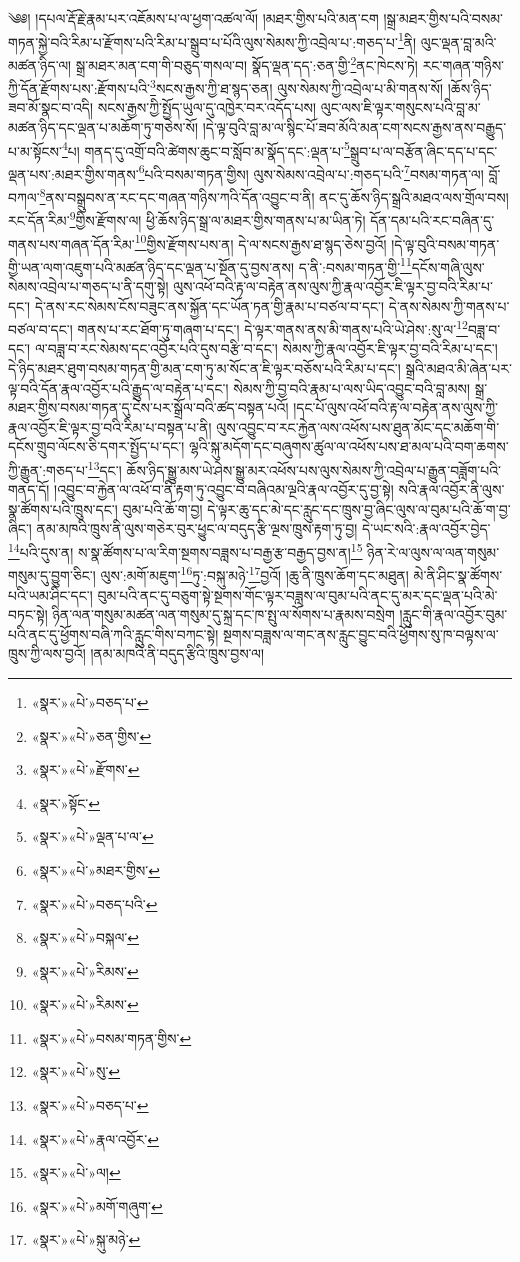 ༄༅། །དཔལ་རྡོ་རྗེ་རྣམ་པར་འཇོམས་པ་ལ་ཕྱག་འཚལ་ལོ། །མཐར་གྱིས་པའི་མན་ངག །སྒྲ་མཐར་གྱིས་པའི་བསམ་གཏན་སྐྱེ་བའི་རིམ་པ་རྫོགས་པའི་རིམ་པ་སྒྲུབ་པ་པོའི་ལུས་སེམས་ཀྱི་འབྲེལ་པ་:གཅད་པ་\footnote{«སྣར་»«པེ་»བཅད་པ་}ནི། ལུང་ལྡན་བླ་མའི་མཚན་ཉིད་ལ། སྒྲ་མཐར་མན་ངག་གི་བཅུད་གསལ་བ། སྣོད་ལྡན་དད་:ཅན་གྱི་\footnote{«སྣར་»«པེ་»ཅན་གྱིས་}ནང་ཁེངས་ཏེ། རང་གཞན་གཉིས་ཀྱི་དོན་རྫོགས་པས་:རྫོགས་པའི་\footnote{«སྣར་»«པེ་»རྫོགས་}སངས་རྒྱས་ཀྱི་ཐ་སྙད་ཅན། ལུས་སེམས་ཀྱི་འབྲེལ་པ་མི་གནས་སོ། །ཆོས་ཉིད་ཟབ་མོ་སྣང་བ་འདི། སངས་རྒྱས་ཀྱི་སྤྱོད་ཡུལ་དུ་འཁྱེར་བར་འདོད་པས། ལུང་ལས་ཇི་ལྟར་གསུངས་པའི་བླ་མ་མཚན་ཉིད་དང་ལྡན་པ་མཆོག་ཏུ་གཅེས་སོ། །དེ་ལྟ་བུའི་བླ་མ་ལ་སྙིང་པོ་ཟབ་མོའི་མན་ངག་སངས་རྒྱས་ནས་བརྒྱུད་པ་མ་སྟོངས་\footnote{«སྣར་»སྟོང་}པ། གནད་དུ་འགྲོ་བའི་ཚེགས་ཆུང་བ་སློབ་མ་སྣོད་དང་:ལྡན་པ་\footnote{«སྣར་»«པེ་»ལྡན་པ་ལ་}སྒྲུབ་པ་ལ་བརྩོན་ཞིང་དད་པ་དང་ལྡན་པས་:མཐར་གྱིས་གནས་\footnote{«སྣར་»«པེ་»མཐར་གྱིས་}པའི་བསམ་གཏན་གྱིས། ལུས་སེམས་འབྲེལ་པ་:གཅད་པའི་\footnote{«སྣར་»«པེ་»བཅད་པའི་}བསམ་གཏན་ལ། བློ་བཀལ་\footnote{«སྣར་»«པེ་»བསྐལ་}ནས་བསྒྲུབས་ན་རང་དང་གཞན་གཉིས་ཀའི་དོན་འབྱུང་བ་ནི། ནང་དུ་ཆོས་ཉིད་སྒྲའི་མཐའ་ལས་གྲོལ་བས། རང་དོན་རིམ་\footnote{«སྣར་»«པེ་»རིམས་}གྱིས་རྫོགས་ལ། ཕྱི་ཆོས་ཉིད་སྒྲ་ལ་མཐར་གྱིས་གནས་པ་མ་ཡིན་ཏེ། དོན་དམ་པའི་རང་བཞིན་དུ་གནས་པས་གཞན་དོན་རིམ་\footnote{«སྣར་»«པེ་»རིམས་}གྱིས་རྫོགས་པས་ན། དེ་ལ་སངས་རྒྱས་ཐ་སྙད་ཅེས་བྱའོ། །དེ་ལྟ་བུའི་བསམ་གཏན་གྱི་ཡན་ལག་འཇུག་པའི་མཚན་ཉིད་དང་ལྡན་པ་སྔོན་དུ་བྱས་ནས། ད་ནི་:བསམ་གཏན་གྱི་\footnote{«སྣར་»«པེ་»བསམ་གཏན་གྱིས་}དངོས་གཞི་ལུས་སེམས་འབྲེལ་པ་གཅད་པ་ནི་དགུ་སྟེ། ལུས་འཕོ་བའི་རྟ་ལ་བརྟེན་ནས་ལུས་ཀྱི་རྣལ་འབྱོར་ཇི་ལྟར་བྱ་བའི་རིམ་པ་དང་། དེ་ནས་རང་སེམས་ངོས་བཟུང་ནས་སྐྱོན་དང་ཡོན་ཏན་གྱི་རྣམ་པ་བཙལ་བ་དང་། དེ་ནས་སེམས་ཀྱི་གནས་པ་བཙལ་བ་དང་། གནས་པ་རང་ཐོག་ཏུ་གཞག་པ་དང་། དེ་ལྟར་གནས་ནས་མི་གནས་པའི་ཡེ་ཤེས་:སུ་ལ་\footnote{«སྣར་»«པེ་»སུ་}བཟླ་བ་དང་། ལ་བཟླ་བ་རང་སེམས་དང་འབྱོར་པའི་དུས་བརྩི་བ་དང་། སེམས་ཀྱི་རྣལ་འབྱོར་ཇི་ལྟར་བྱ་བའི་རིམ་པ་དང་། དེ་ཉིད་མཐར་ཐུག་བསམ་གཏན་གྱི་མན་ངག་ཏུ་མ་སོང་ན་ཇི་ལྟར་བཅོས་པའི་རིམ་པ་དང་། སྒྲའི་མཐའ་མི་ཞེན་པར་ལྟ་བའི་དོན་རྣལ་འབྱོར་པའི་རྒྱུད་ལ་བརྟེན་པ་དང་། སེམས་ཀྱི་བྱ་བའི་རྣམ་པ་ལས་ཡིད་འབྱུང་བའི་བླ་མས། སྒྲ་མཐར་གྱིས་བསམ་གཏན་དུ་ངེས་པར་སྒྲོལ་བའི་ཚད་བསྟན་པའོ། །དང་པོ་ལུས་འཕོ་བའི་རྟ་ལ་བརྟེན་ནས་ལུས་ཀྱི་རྣལ་འབྱོར་ཇི་ལྟར་བྱ་བའི་རིམ་པ་བསྟན་པ་ནི། ལུས་འབྱུང་བ་རང་རྐྱེན་ལས་འཕོས་པས་ཐུན་མོང་དང་མཆོག་གི་དངོས་གྲུབ་ལོངས་ཅི་དགར་སྤྱོད་པ་དང་། ལྷའི་སྐུ་མདོག་དང་བཞུགས་ཚུལ་ལ་འཕོས་པས་ཐ་མལ་པའི་བག་ཆགས་ཀྱི་རྒྱུན་:གཅད་པ་\footnote{«སྣར་»«པེ་»བཅད་པ་}དང་། ཆོས་ཉིད་སྒྱུ་མས་ཡེ་ཤེས་སྒྱུ་མར་འཕོས་པས་ལུས་སེམས་ཀྱི་འབྲེལ་པ་རྒྱུན་བཟློག་པའི་གནད་དོ། །འབྱུང་བ་རྐྱེན་ལ་འཕོ་བ་ནི་རྟག་ཏུ་འབྱུང་བ་བཞིའམ་ལྔའི་རྣལ་འབྱོར་དུ་བྱ་སྟེ། སའི་རྣལ་འབྱོར་ནི་ལུས་སྣ་ཚོགས་པའི་ཁྲུས་དང་། བུམ་པའི་ཆོ་ག་བྱ། དེ་ལྟར་ཆུ་དང་མེ་དང་རླུང་དང་ཁྲུས་བྱ་ཞིང་ལུས་ལ་བུམ་པའི་ཆོ་ག་བྱ་ཞིང་། ནམ་མཁའི་ཁྲུས་ནི་ལུས་གཅེར་བུར་ཕྱུང་ལ་བདུད་རྩི་ལྔས་ཁྲུས་རྟག་ཏུ་བྱ། དེ་ཡང་སའི་:རྣལ་འབྱོར་བྱེད་\footnote{«སྣར་»«པེ་»རྣལ་འབྱོར་}པའི་དུས་ན། ས་སྣ་ཚོགས་པ་ལ་རིག་སྔགས་བཟླས་པ་བརྒྱ་རྩ་བརྒྱད་བྱས་ན།\footnote{«སྣར་»«པེ་»ལ།} ཉིན་རེ་ལ་ལུས་ལ་ལན་གསུམ་གསུམ་དུ་བྱུག་ཅིང་། ལུས་:མགོ་མཇུག་\footnote{«སྣར་»«པེ་»མགོ་གཞུག་}ཏུ་:བསྐུ་མཉེ་\footnote{«སྣར་»«པེ་»སྐུ་མཉེ་}བྱའོ། །ཆུ་ནི་ཁྲུས་ཆོག་དང་མཐུན། མེ་ནི་ཤིང་སྣ་ཚོགས་པའི་ཡམ་ཤིང་དང་། བུམ་པའི་ནང་དུ་བཅུག་སྟེ་སྔགས་གོང་ལྟར་བཟླས་ལ་བུམ་པའི་ནང་དུ་མར་དང་ལྡན་པའི་མེ་བཏང་སྟེ། ཉིན་ལན་གསུམ་མཚན་ལན་གསུམ་དུ་སྐྲ་དང་ཁ་སྤུ་ལ་སོགས་པ་རྣམས་བསྲེག །རླུང་གི་རྣལ་འབྱོར་བུམ་པའི་ནང་དུ་ཕྱོགས་བཞི་ཀའི་རླུང་གིས་བཀང་སྟེ། སྔགས་བཟླས་ལ་གང་ནས་རླུང་བྱུང་བའི་ཕྱོགས་སུ་ཁ་བལྟས་ལ་ཁྲུས་ཀྱི་ལས་བྱའོ། །ནམ་མཁའི་ནི་བདུད་རྩིའི་ཁྲུས་བྱས་ལ། 